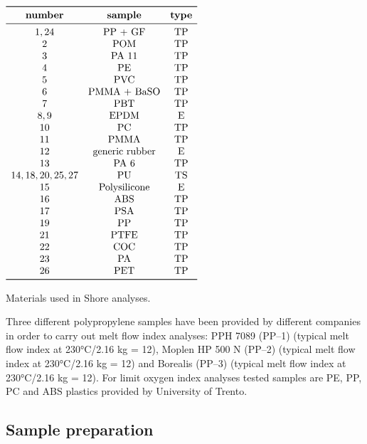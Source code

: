 \documentclass[a4paper, 11pt]{article}
\begin{document}
\begin{table}[htp]
	\centering
	$
	\begin{array}{ccc}
	\toprule
	\textbf{number} & \textbf{sample} & \textbf{type} \\
	\midrule
	1,24 & \text{PP + GF} & \text{TP}\\
	2 & \text{POM} & \text{TP}\\
	3 & \text{PA 11} & \text{TP}\\
	4 & \text{PE} & \text{TP}\\
	5 & \text{PVC} & \text{TP}\\
	6 & \text{PMMA + BaSO} & \text{TP}\\
	7 & \text{PBT} & \text{TP}\\
	8,9 & \text{EPDM} & \text{E}\\
    10 & \text{PC} & \text{TP}\\
	11 & \text{PMMA} & \text{TP}\\
	12 & \text{generic rubber} & \text{E}\\
	13 & \text{PA 6} & \text{TP}\\
	14,18,20,25,27 & \text{PU} & \text{TS}\\
	15 & \text{Polysilicone} & \text{E}\\
	16 & \text{ABS} & \text{TP}\\
	17 & \text{PSA} & \text{TP}\\
	19 & \text{PP} & \text{TP}\\
	21 & \text{PTFE} & \text{TP}\\
	22 & \text{COC} & \text{TP}\\
	23 & \text{PA} & \text{TP}\\
	26 & \text{PET} & \text{TP}\\
	\bottomrule
	\end{array}
	$
	\caption{Materials used in Shore analyses.}
	\label{tab:polymers}
\end{table}
Three different polypropylene samples have been provided by different companies in order to carry out melt flow index analyses: PPH 7089 (PP–1) (typical melt flow index at 230°C/2.16 kg = 12), Moplen HP 500 N (PP–2) (typical melt flow index at 230°C/2.16 kg = 12) and Borealis (PP–3) (typical melt flow index at 230°C/2.16 kg = 12). For limit oxygen index analyses tested samples are PE, PP, PC and ABS plastics provided by University of Trento. 

\subsection{Sample preparation}
\end{document}
